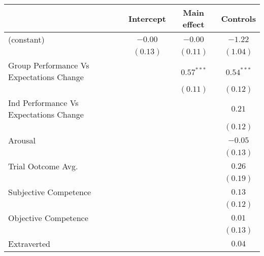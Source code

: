 
\begin{table}
\begin{center}
\begin{tabular}{l c c c }
\toprule
 & Intercept & Main effect & Controls \\
\midrule
(constant)                                              & $-0.00$  & $-0.00$               & $-1.22$               \\
                                                        & $(0.13)$ & $(0.11)$              & $(1.04)$              \\
Group Performance Vs Expectations Change                &          & $\mathbf{0.57}^{***}$ & $\mathbf{0.54}^{***}$ \\
                                                        &          & $(0.11)$              & $(0.12)$              \\
Ind Performance Vs Expectations Change                  &          &                       & $0.21$                \\
                                                        &          &                       & $(0.12)$              \\
Arousal                                                 &          &                       & $-0.05$               \\
                                                        &          &                       & $(0.13)$              \\
Trial Ootcome Avg.                                      &          &                       & $0.26$                \\
                                                        &          &                       & $(0.19)$              \\
Subjective Competence                                   &          &                       & $0.13$                \\
                                                        &          &                       & $(0.12)$              \\
Objective Competence                                    &          &                       & $0.01$                \\
                                                        &          &                       & $(0.13)$              \\
Extraverted                                             &          &                       & $0.04$                \\

\end{tabular}
\end{center}
\end{table}
